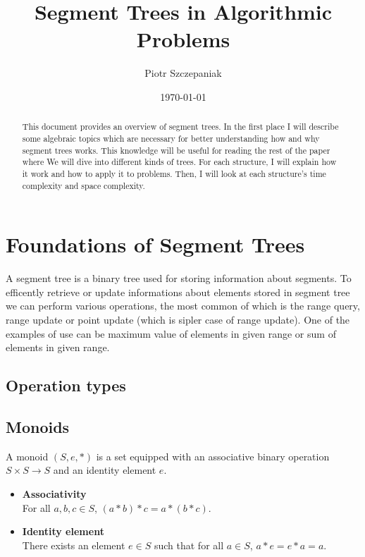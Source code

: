 \documentclass{article}
\title{Segment Trees in Algorithmic Problems}
\author{Piotr Szczepaniak}
\date{\today}
\begin{document}
\maketitle

\tableofcontents

\begin{abstract}
This document provides an overview of segment trees. In the first place
I will describe some algebraic topics which are necessary for better
understanding how and why segment trees works. This knowledge will be useful
for reading the rest of the paper where We will dive into different kinds of trees.
For each structure, I will explain how it work and how to apply it to problems.
Then, I will look at each structure's time complexity and space complexity.
\end{abstract}

\section{Foundations of Segment Trees}
A segment tree is a binary tree used for storing information about segments. 
To efficently retrieve or update informations about elements stored 
in segment tree we can perform various operations, the 
most common of which is the range query, range update or point update
(which is sipler case of range update). One of the examples of use can be maximum value of 
elements in given range or sum of elements in given range.



\subsection{Operation types}


\subsection{Monoids}
A monoid \( (S, e, \ast) \) is a set equipped with an associative binary operation \( S \times S \to S \) and
an identity element \(e\). 
\begin{itemize}
    \item \textbf{Associativity} \\
    For all \( a, b, c \in S \), \( (a \ast b) \ast c = a \ast (b \ast c) \).
    \item \textbf{Identity element} \\
    There exists an element \( e \in S \) such that for all \( a \in S \), \( a \ast e = e \ast a = a \).
\end{itemize}
\end{document}
